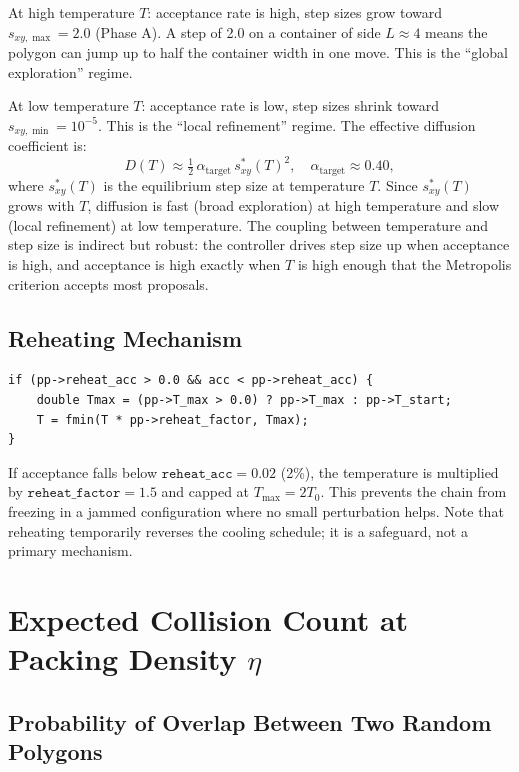\documentclass[11pt,oneside]{article}
\begin{document}
At high temperature $T$: acceptance rate is high, step sizes grow
toward $s_{xy,\max} = 2.0$ (Phase A). A step of 2.0 on a container of
side $L \approx 4$ means the polygon can jump up to half the container
width in one move. This is the ``global exploration'' regime.

At low temperature $T$: acceptance rate is low, step sizes shrink
toward $s_{xy,\min} = 10^{-5}$. This is the ``local refinement''
regime. The effective diffusion coefficient is:
\begin{equation}
  D(T) \approx \tfrac{1}{2}\,\alpha_{\mathrm{target}}\,s_{xy}^*(T)^2,
  \quad \alpha_{\mathrm{target}} \approx 0.40,
  \label{eq:diffusion}
\end{equation}
where $s_{xy}^*(T)$ is the equilibrium step size at temperature $T$.
Since $s_{xy}^*(T)$ grows with $T$, diffusion is fast (broad
exploration) at high temperature and slow (local refinement) at low
temperature. The coupling between temperature and step size is
indirect but robust: the controller drives step size up when acceptance
is high, and acceptance is high exactly when $T$ is high enough that
the Metropolis criterion accepts most proposals.

\subsection{Reheating Mechanism}

\begin{lstlisting}[style=cstyle,caption={Reheating in \texttt{run\_phase()}.}]
if (pp->reheat_acc > 0.0 && acc < pp->reheat_acc) {
    double Tmax = (pp->T_max > 0.0) ? pp->T_max : pp->T_start;
    T = fmin(T * pp->reheat_factor, Tmax);
}
\end{lstlisting}

If acceptance falls below $\texttt{reheat\_acc} = 0.02$ (2\%), the
temperature is multiplied by $\texttt{reheat\_factor}=1.5$ and capped
at $T_{\max} = 2 T_0$. This prevents the chain from freezing in a
jammed configuration where no small perturbation helps. Note that
reheating temporarily reverses the cooling schedule; it is a
safeguard, not a primary mechanism.

\section{Expected Collision Count at Packing Density $\eta$}
\label{sec:collisions}

\subsection{Probability of Overlap Between Two Random Polygons}
\end{document}

